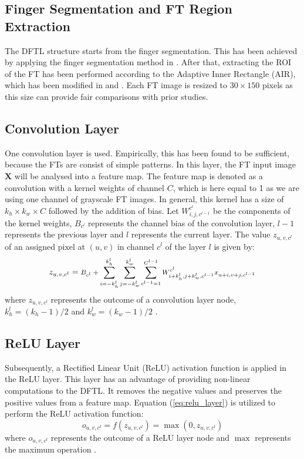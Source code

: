 \documentclass[conference]{IEEEtran}
\begin{document}
\subsection{Finger Segmentation and FT Region Extraction}
The DFTL structure starts from the finger segmentation. This has been achieved by applying the finger segmentation method in \cite{Al-Nima2016Robust}. After that, extracting the ROI of the FT has been performed according to the Adaptive Inner Rectangle (AIR), which has been modified in \cite{Al-Nima2016Robust} and \cite{Al-Nima2017efficient}. Each FT image is resized to $30 \times 150$ pixels as this size can provide fair comparisons with prior studies.

\subsection{Convolution Layer}
One convolution layer is used. Empirically, this has been found to be sufficient, because the FTs are consist of simple patterns. In this layer, the FT input image $\textbf{X}$ will be analysed into a feature map. The feature map is denoted as a convolution with a kernel weights of channel $C$, which is here equal to 1 as we are using one channel of grayscale FT images. In general, this kernel has a size of $k_h \times k_w \times C$ followed by the addition of bias. Let $W_{i,j,c^{l-1}}^{c^{l}}$ be the components of the kernel weights, $B_{c^{l}}$ represents the channel bias of the convolution layer, $l-1$ represents the previous layer and $l$ represents the current layer. The value $z_{u,v,c^{l}}$ of an assigned pixel at $(u,v)$ in channel $c^{l}$ of the layer $l$ is given by:
\begin{equation}
z_{u,v,c^{l}}= \text{\footnotesize $B_{c^{l}}+\sum_{i=-k_h^{l}}^{k_h^{l}}\sum_{j=-k_w^{l}}^{k_w^{l}}\sum_{c^{l-1}=1}^{C^{l-1}} W_{i+k_h^{l},j+k_w^{l},c^{l-1}}^{c^{l}} x_{u+i,v+j,c^{l-1}}$}
\label{eq:conv_layer}
\end{equation}
where $z_{u,v,c^{l}}$ represents the outcome of a convolution layer node, $k_h^{l}=(k_h-1)/2$ and $k_w^{l}=(k_w-1)/2$ \cite{simo2016learning}.

\subsection{ReLU Layer}
Subsequently, a Rectified Linear Unit (ReLU) activation function is applied in the ReLU layer. This layer has an advantage of providing non-linear computations to the DFTL. It removes the negative values and preserves the positive values from a feature map. Equation (\ref{eq:relu_layer}) is utilized to perform the ReLU activation function:
\begin{equation}
o_{u,v,c^{l}}=f(z_{u,v,c^{l}})=\max(0,z_{u,v,c^{l}})
\label{eq:relu_layer}
\end{equation}
where $o_{u,v,c^{l}}$ represents the outcome of a ReLU layer node and $\max$ represents the maximum operation \cite{krizhevsky2012imagenet}.\\
\end{document}
